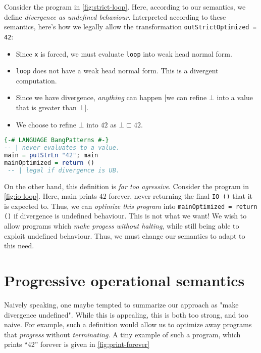 \documentclass[sigplan,\review anonymous]{acmart}
\newcommand{\raw}[1]{\texttt{#1}}
\begin{document}
Consider the program in \autoref{fig:strict-loop}. Here, according
to our semantics, we define \emph{divergence as undefined behaviour}.
Interpreted according to these semantics, here's how we legally
allow the transformation \raw{outStrictOptimized = 42}:

\begin{itemize}
    \item Since \raw{x} is forced, we must evaluate \raw{loop} into weak head normal form.
    \item \raw{loop} does not have a weak head normal form. This is a divergent computation.
    \item Since we have divergence, \emph{anything} can happen [we can refine $\bot$ into a
    value that is greater than $\bot$].
    \item We choose to refine $\bot$ into $42$ as $\bot \sqsubset 42$.
\end{itemize}

\begin{lstlisting}[language=haskell, caption=An example of how defining divergence as UB is too agressive]
{-# LANGUAGE BangPatterns #-}
-- | never evaluates to a value.
main = putStrLn "42"; main
mainOptimized = return () 
 -- | legal if divergence is UB.
\end{lstlisting}


On the other hand, this definition is \emph{far too agressive}. Consider
the program in \autoref{fig:io-loop}. Here, main prints $42$ forever,
never returning the final \raw{IO ()} that it is expected to. Thus,
we can \emph{optimize this program} into \raw{mainOptimized = return ()}
if divergence is undefined behaviour. This is not what we want! We wish
to allow programs which \emph{make progess without halting}, while
still being able to exploit undefined behaviour. Thus, we must change our
semantics to adapt to this need.

\section{Progressive operational semantics}

Naively speaking, one maybe tempted to summarize our approach as
"make divergence undefined". While this is appealing, this is both too
strong, and too naive. For example, such a definition would allow us to
optimize away programs that \emph{progress} without \emph{terminating}.
A tiny example of such a program, which prints ``42'' forever is
given in \autoref{fig:print-forever}
\end{document}

